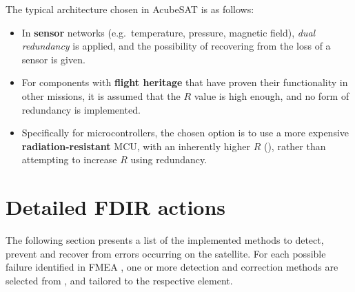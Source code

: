 \documentclass[a4paper,nobib,final]{tufte-book}
\begin{document}
The typical architecture chosen in AcubeSAT is as follows:
\begin{itemize}
	\item In \textbf{sensor} networks (e.g.\ temperature, pressure, magnetic field), \emph{dual redundancy} is applied, and the possibility of recovering from the loss of a sensor is given.
	\item For components with \textbf{flight heritage} that have proven their functionality in other missions, it is assumed that the \( R \) value is high enough, and no form of redundancy is implemented.
	\item Specifically for microcontrollers, the chosen option is to use a more expensive \textbf{radiation-resistant} \acs{MCU}, with an inherently higher \( R \) (), rather than attempting to increase \( R \) using redundancy.
\end{itemize}

\FloatBarrier
\section{Detailed \acs{FDIR} actions}

The following section presents a list of the implemented methods to detect, prevent and recover from errors occurring on the satellite. For each possible failure identified in \acs{FMEA} \autocite{retselis_acubesat_fmea_2020}, one or more detection and correction methods are selected from , and tailored to the respective element.


\clearpage
\end{document}
